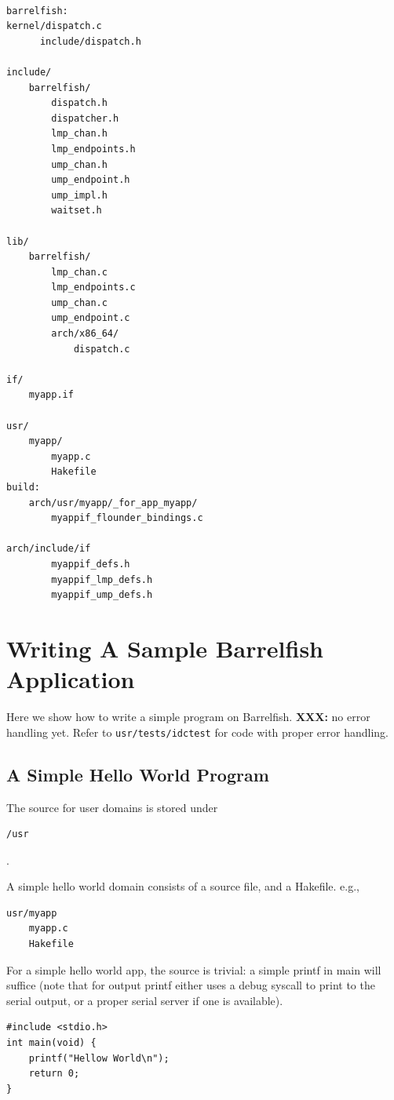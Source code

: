 \documentclass[a4paper,twoside]{report} %
\begin{document}
\begin{verbatim}

barrelfish:
kernel/dispatch.c
      include/dispatch.h

include/
    barrelfish/
        dispatch.h
        dispatcher.h
        lmp_chan.h
        lmp_endpoints.h
        ump_chan.h
        ump_endpoint.h
        ump_impl.h
        waitset.h

lib/
    barrelfish/
        lmp_chan.c
        lmp_endpoints.c
        ump_chan.c
        ump_endpoint.c
        arch/x86_64/
            dispatch.c 

if/
    myapp.if

usr/
    myapp/
        myapp.c
        Hakefile
build:
    arch/usr/myapp/_for_app_myapp/ 
        myappif_flounder_bindings.c

arch/include/if
        myappif_defs.h
        myappif_lmp_defs.h
        myappif_ump_defs.h

\end{verbatim}


\section{Writing A Sample Barrelfish Application}

Here we show how to write a simple program on Barrelfish.  \textbf{XXX:} no
error handling yet.  Refer to \texttt{usr/tests/idctest} for code with proper
error handling.

\subsection{A Simple Hello World Program}

The source for user domains is stored under \begin{verbatim}/usr\end{verbatim}. 

A simple hello world domain consists of a source file, and a Hakefile. e.g.,
\begin{verbatim}
usr/myapp
    myapp.c
    Hakefile
\end{verbatim}

For a simple hello world app, the source is trivial: a simple printf in main
will suffice (note that for output printf either uses a debug syscall to print
to the serial output, or a proper serial server if one is available).

\begin{verbatim}
#include <stdio.h> 
int main(void) {
    printf("Hellow World\n");
    return 0;
}
\end{verbatim}
\end{document}

